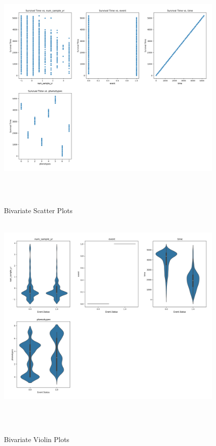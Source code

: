 \begin{figure}[h]
    \centering
    \includegraphics[scale=0.3]{Figures/EDA/scatter4.png}
    \caption{Bivariate Scatter Plots}
    \label{fig:scatter2}
\end{figure}

\begin{figure}[h]
    \centering
    \includegraphics[scale=0.3]{Figures/EDA/violin4.png}
    \caption{Bivariate Violin Plots}
    \label{fig:your_label}
\end{figure}


